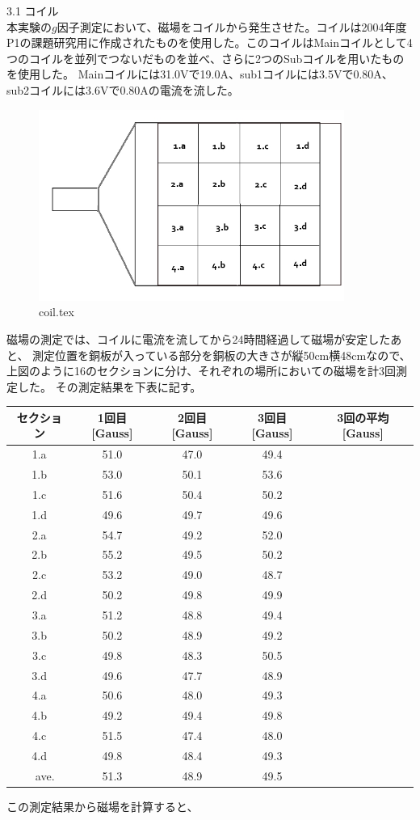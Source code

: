 3.1  コイル\\
  本実験の\(g\)因子測定において、磁場をコイルから発生させた。コイルは2004年度P1の課題研究用に作成されたものを使用した。このコイルはMainコイルとして4つのコイルを並列でつないだものを並べ、さらに2つのSubコイルを用いたものを使用した。
Mainコイルには31.0Vで19.0A、sub1コイルには3.5Vで0.80A、sub2コイルには3.6Vで0.80Aの電流を流した。
\begin{figure}[htbp]
 \begin{center}
  \includegraphics[width=100mm]{coil.jpg}
  \caption[width=100mm]{coil.tex}
 \end{center}
\end{figure}
磁場の測定では、コイルに電流を流してから24時間経過して磁場が安定したあと、
測定位置を銅板が入っている部分を銅板の大きさが縦50cm横48cmなので、上図のように16のセクションに分け、それぞれの場所においての磁場を計3回測定した。
その測定結果を下表に記す。
\begin{center}
\begin{tabular}{c|ccc|c}\hline
  セクション&1回目[Gauss]&2回目[Gauss]&3回目[Gauss]&3回の平均[Gauss]\\ \hline
  1.a & 51.0 & 47.0 & 49.4 & \\
  1.b & 53.0 & 50.1 & 53.6 & \\
  1.c & 51.6 & 50.4 & 50.2 & \\
  1.d & 49.6 & 49.7 & 49.6 & \\
  2.a & 54.7 & 49.2 & 52.0 & \\
  2.b & 55.2 & 49.5 & 50.2 & \\
  2.c & 53.2 & 49.0 & 48.7 & \\
  2.d & 50.2 & 49.8 & 49.9 & \\
  3.a & 51.2 & 48.8 & 49.4 & \\
  3.b & 50.2 & 48.9 & 49.2 & \\
  3.c & 49.8 & 48.3 & 50.5 & \\
  3.d & 49.6 & 47.7 & 48.9 & \\
  4.a & 50.6 & 48.0 & 49.3 & \\
  4.b & 49.2 & 49.4 & 49.8 & \\
  4.c & 51.5 & 47.4 & 48.0 & \\
  4.d & 49.8 & 48.4 & 49.3 & \\
　ave.& 51.3 & 48.9 & 49.5 & \\
\end{tabular}
\end{center}
この測定結果から磁場を計算すると、
